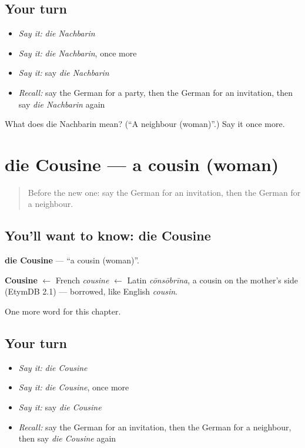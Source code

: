 \subsection*{Your turn}
\begin{itemize}
\raggedright
  \item \emph{Say it:} \emph{die Nachbarin}
  \item \emph{Say it:} \emph{die Nachbarin}, once more
  \item \emph{Say it:} say \emph{die Nachbarin}
  \item \emph{Recall:} say the German for a party, then the German for an invitation, then say \emph{die Nachbarin} again
\end{itemize}

\begin{tcolorbox}[breakable,colback=teal!4,colframe=teal!35!black,title={Before you move on}]
What does die Nachbarin mean? (\textquotedblleft{}A neighbour (woman)\textquotedblright{}.) Say it once more.
\end{tcolorbox}
\section[die Cousine]{die Cousine — a cousin (woman)}

\label{lesson:GE-C164-cousine}



\begin{quote}
Before the new one: say the German for an invitation, then the German for a neighbour.
\end{quote}

\subsection*{You'll want to know: die Cousine}
\textbf{die Cousine} — \textquotedblleft{}a cousin (woman)\textquotedblright{}.

\begin{cousinweb}
\textbf{Cousine} $\leftarrow$ French \emph{cousine} $\leftarrow$ Latin \emph{cōnsōbrīna}, a cousin on the mother's side (EtymDB 2.1) — borrowed, like English \emph{cousin}.
\end{cousinweb}

\begin{grammarlens}[title={What you've built}]
One more word for this chapter.
\end{grammarlens}

\subsection*{Your turn}
\begin{itemize}
\raggedright
  \item \emph{Say it:} \emph{die Cousine}
  \item \emph{Say it:} \emph{die Cousine}, once more
  \item \emph{Say it:} say \emph{die Cousine}
  \item \emph{Recall:} say the German for an invitation, then the German for a neighbour, then say \emph{die Cousine} again
\end{itemize}

